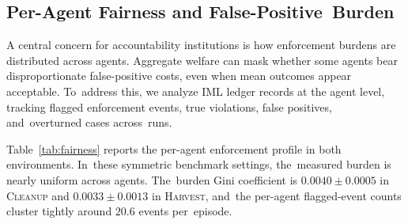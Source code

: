 \documentclass[mca,article,accept,pdftex,oneauthor]{Definitions/mdpi}
\begin{document}
\subsection{Per-Agent Fairness and False-Positive~Burden}
\label{sec:fairness}

A central concern for accountability institutions is how enforcement burdens are distributed across agents. Aggregate welfare can mask whether some agents bear disproportionate false-positive costs, even when mean outcomes appear acceptable. To~address this, we analyze IML ledger records at the agent level, tracking flagged enforcement events, true violations, false positives, and~overturned cases across~runs.

Table~\ref{tab:fairness} reports the per-agent enforcement profile in both environments. In~these symmetric benchmark settings, the~measured burden is nearly uniform across agents. The~burden Gini coefficient is $0.0040 \pm 0.0005$ in \textsc{Cleanup} and $0.0033 \pm 0.0013$ in \textsc{Harvest}, and~the per-agent flagged-event counts cluster tightly around $20.6$ events per~episode.
\end{document}
